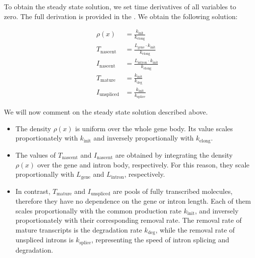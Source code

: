 \documentclass[11pt]{article}
\begin{document}
    To obtain the steady state solution, we set time derivatives of all variables to zero. The full derivation is provided in the . We obtain the following solution:
    \begin{tcolorbox}[
    	colback=white, colframe=black, boxrule=0.4pt, arc=1pt,
    	title=Steady state solution, fonttitle=\bfseries\small,
    	coltitle=black, colbacktitle=white, %
    	left=6pt, right=6pt, top=4pt, bottom=4pt,
    	]
    	\begin{subequations}
    	\begin{align}
    		\rho(x) &= \frac{k_{\mathrm{init}}}{k_{\mathrm{elong}}} \label{eq:rho_ss}\\
    		T_{\mathrm{nascent}} &= \frac{L_{\mathrm{gene}} \cdot k_\mathrm{init}}{k_\mathrm{elong}}  \label{eq:t_nas_ss}  \\
    		I_{\mathrm{nascent}} &= \frac{L_{\mathrm{intron}} \cdot  k_\mathrm{init}}{k_\mathrm{elong}}  \label{eq:i_nas_ss}  \\
    		T_{\mathrm{mature}} &= \frac{k_\mathrm{init} }{k_\mathrm{deg}}  \label{eq:t_mat_ss}  \\
    		I_{\mathrm{unspliced}} &= \frac{k_\mathrm{init} }{k_\mathrm{splice}}  \label{eq:i_unspliced_ss}
    	\end{align}
    	\end{subequations}    	
    \end{tcolorbox}
	We will now comment on the steady state solution described above.
	\begin{itemize}
		\item The density $\rho(x)$ is uniform over the whole gene body. Its value scales proportionately with $k_{\mathrm{init}}$ and inversely proportionally with $k_{\mathrm{elong}}$.
		\item The values of $T_{\mathrm{nascent}}$ and $I_{\mathrm{nascent}}$ are obtained by integrating the density $\rho(x)$ over the gene and intron body, respectively. For this reason, they scale proportionally with $L_{\mathrm{gene}}$ and $L_{\mathrm{intron}}$, respectively.
		\item In contrast, $T_{\mathrm{mature}}$ and $I_{\mathrm{unspliced}}$ are pools of fully transcribed molecules, therefore they have no dependence on the gene or intron length. Each of them scales proportionally with the common production rate $k_{\mathrm{init}}$, and inversely proportionately with their corresponding removal rate. The removal rate of mature transcripts is the degradation rate $k_{\mathrm{deg}}$, while the removal rate of unspliced introns is $k_{\mathrm{splice}}$, representing the speed of intron splicing and degradation.
	\end{itemize}
	
\end{document}
